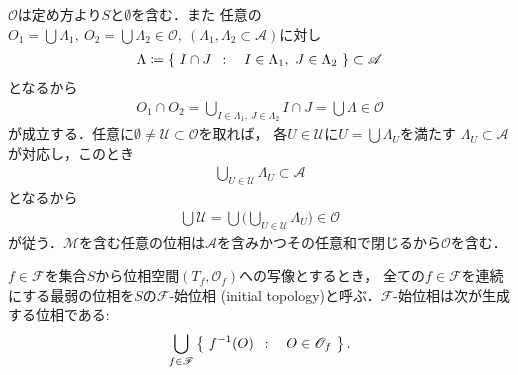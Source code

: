 	\begin{prf}
		$\mathscr{O}$は定め方より$S$と$\emptyset$を含む．また
		任意の$O_1 = \bigcup \Lambda_1,\ O_2=\bigcup \Lambda_2 \in \mathscr{O},\ 
		(\Lambda_1,\Lambda_2 \subset \mathscr{A})$に対し
		\begin{align}
			\Lambda \coloneqq
			\left\{\ I \cap J\ \, : \quad I \in \Lambda_1,\ J \in \Lambda_2\ \right\} \subset \mathscr{A}
		\end{align}
		となるから
		\begin{align}
			O_1 \cap O_2 = \bigcup_{I \in \Lambda_1,\ J \in \Lambda_2} I \cap J
			= \bigcup \Lambda \in \mathscr{O}
		\end{align}
		が成立する．任意に$\emptyset \neq \mathscr{U} \subset \mathscr{O}$を取れば，
		各$U \in \mathscr{U}$に$U = \bigcup \Lambda_U$を満たす
		$\Lambda_U \subset \mathscr{A}$が対応し，このとき
		\begin{align}
			\bigcup_{U \in \mathscr{U}} \Lambda_U \subset \mathscr{A}
		\end{align}
		となるから
		\begin{align}
			\bigcup \mathscr{U} = \bigcup \Biggl(\bigcup_{U \in \mathscr{U}} \Lambda_U\Biggr)
			\in \mathscr{O}
		\end{align}
		が従う．$\mathscr{M}$を含む任意の位相は$\mathscr{A}$を含みかつその任意和で閉じるから$\mathscr{O}$を含む．
		\QED
	\end{prf}
	
	\begin{screen}
		\begin{thm}[Alexanderの定理]
		\end{thm}
	\end{screen}
	
	\begin{screen}
		\begin{dfn}[始位相]
			$f \in \mathscr{F}$を集合$S$から位相空間$(T_f,\mathscr{O}_f)$への写像とするとき，
			全ての$f \in \mathscr{F}$を連続にする最弱の位相を$S$の$\mathscr{F}$-始位相
			(initial topology)と呼ぶ．$\mathscr{F}$-始位相は次が生成する位相である:
			\begin{align}
				\bigcup_{f \in \mathscr{F}} \left\{\ f^{-1}(O)\ \, : \quad O \in \mathscr{O}_f\ \right\}.
			\end{align}
		\end{dfn}
	\end{screen}